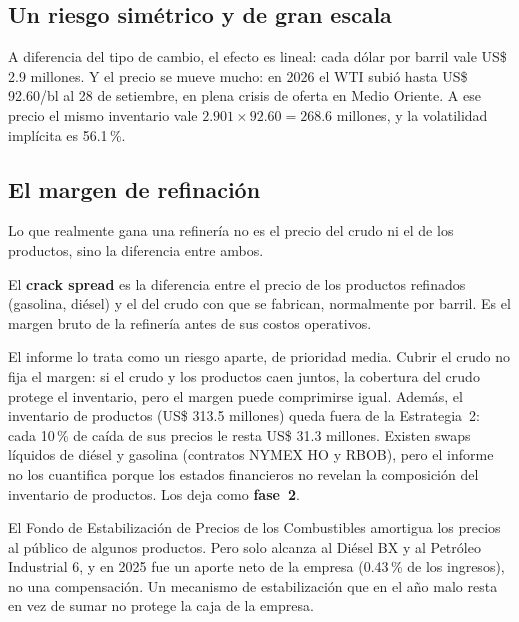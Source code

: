 \subsection{Un riesgo simétrico y de gran escala}

A diferencia del tipo de cambio, el efecto es lineal: cada dólar por barril vale US\$ 2.9 millones. Y el precio se mueve mucho: en 2026 el WTI subió hasta US\$ 92.60/bl al 28 de setiembre, en plena crisis de oferta en Medio Oriente. A ese precio el mismo inventario vale $2.901\times92.60=268.6$ millones, y la volatilidad implícita es 56.1\,\%.

\subsection{El margen de refinación}

Lo que realmente gana una refinería no es el precio del crudo ni el de los productos, sino la diferencia entre ambos.

\begin{definicion}
El \textbf{crack spread} es la diferencia entre el precio de los productos refinados (gasolina, diésel) y el del crudo con que se fabrican, normalmente por barril. Es el margen bruto de la refinería antes de sus costos operativos.
\end{definicion}

El informe lo trata como un riesgo aparte, de prioridad media. Cubrir el crudo no fija el margen: si el crudo y los productos caen juntos, la cobertura del crudo protege el inventario, pero el margen puede comprimirse igual. Además, el inventario de productos (US\$ 313.5 millones) queda fuera de la Estrategia~2: cada 10\,\% de caída de sus precios le resta US\$ 31.3 millones. Existen swaps líquidos de diésel y gasolina (contratos NYMEX HO y RBOB), pero el informe no los cuantifica porque los estados financieros no revelan la composición del inventario de productos. Los deja como \textbf{fase~2}.

\begin{informe}
El Fondo de Estabilización de Precios de los Combustibles amortigua los precios al público de algunos productos. Pero solo alcanza al Diésel BX y al Petróleo Industrial 6, y en 2025 fue un aporte neto de la empresa (0.43\,\% de los ingresos), no una compensación. Un mecanismo de estabilización que en el año malo resta en vez de sumar no protege la caja de la empresa.
\end{informe}

